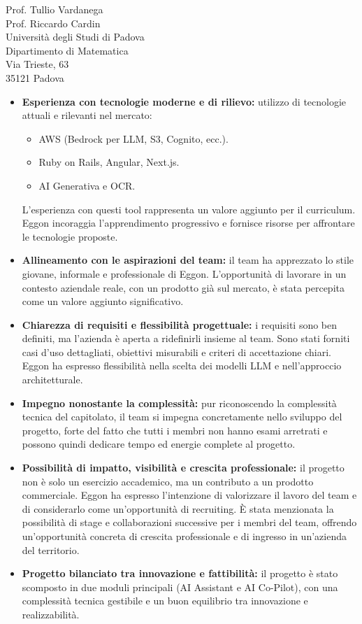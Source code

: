 \documentclass[a4paper,11pt]{letter}
\begin{document}
\begin{letter}{Prof. Tullio Vardanega\\Prof. Riccardo Cardin\\Universit\`a degli Studi di Padova\\Dipartimento di Matematica\\Via Trieste, 63\\35121 Padova}
\begin{itemize}
    \item \textbf{Esperienza con tecnologie moderne e di rilievo:} utilizzo di tecnologie attuali e rilevanti nel mercato:
    \begin{itemize}
        \item AWS (Bedrock per LLM, S3, Cognito, ecc.).
        \item Ruby on Rails, Angular, Next.js.
        \item AI Generativa e OCR.
    \end{itemize}
    L'esperienza con questi tool rappresenta un valore aggiunto per il curriculum. Eggon incoraggia l'apprendimento progressivo e fornisce risorse per affrontare le tecnologie proposte.

    \item \textbf{Allineamento con le aspirazioni del team:} il team ha apprezzato lo stile giovane, informale e professionale di Eggon. L'opportunità di lavorare in un contesto aziendale reale, con un prodotto già sul mercato, è stata percepita come un valore aggiunto significativo.

    \item \textbf{Chiarezza di requisiti e flessibilità progettuale:} i requisiti sono ben definiti, ma l'azienda è aperta a ridefinirli insieme al team. Sono stati forniti casi d'uso dettagliati, obiettivi misurabili e criteri di accettazione chiari. Eggon ha espresso flessibilità nella scelta dei modelli LLM e nell'approccio architetturale.

    \item \textbf{Impegno nonostante la complessità:} pur riconoscendo la complessità tecnica del capitolato, il team si impegna concretamente nello sviluppo del progetto, forte del fatto che tutti i membri non hanno esami arretrati e possono quindi dedicare tempo ed energie complete al progetto.
    
    \item \textbf{Possibilità di impatto, visibilità e crescita professionale:} il progetto non è solo un esercizio accademico, ma un contributo a un prodotto commerciale. Eggon ha espresso l'intenzione di valorizzare il lavoro del team e di considerarlo come un'opportunità di recruiting. È stata menzionata la possibilità di stage e collaborazioni successive per i membri del team, offrendo un'opportunità concreta di crescita professionale e di ingresso in un'azienda del territorio.
    
    \item \textbf{Progetto bilanciato tra innovazione e fattibilità:} il progetto è stato scomposto in due moduli principali (AI Assistant e AI Co-Pilot), con una complessità tecnica gestibile e un buon equilibrio tra innovazione e realizzabilità.
\end{itemize}




\end{letter}
\end{document}
